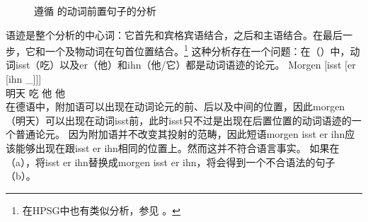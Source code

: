 \begin{figure}
\caption{\label{Abbildung-CG-isst-der-junge-den-kuchen-jacobs}遵循 \citet{Jacobs91a}的动词前置句子的分析}
\end{figure}%
语迹是整个分析的中心词：它首先和宾格宾语结合，之后和主语结合。在最后一步，它和一个及物动词在句首位置结合。\footnote{在HPSG\indexhpsgc 中也有类似分析，参见 。
} 
这种分析存在一个问题：在（）中，动词isst（吃）以及er（他）和ihn（他/它）都是动词语迹的论元。
\ea
\gll Morgen [isst [er [ihn \_]]]\\
     明天 \spacebr{}吃 \spacebr{}他 \spacebr{}他\\
\z
在德语中，附加语可以出现在动词论元的前、后以及中间的位置，因此morgen（明天）可以出现在动词isst前，此时isst只不过是出现在后置位置的动词语迹的一个普通论元。
因为附加语并不改变其投射的范畴，因此短语morgen isst er ihn应该能够出现在跟isst er ihn相同的位置上。然而这并不符合语言事实。
如果在（a），将isst er ihn替换成morgen isst er ihn，将会得到一个不合语法的句子（b）。
\eal
{}

